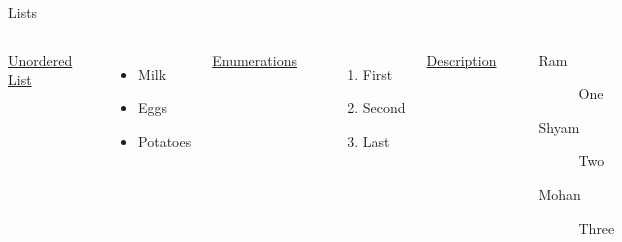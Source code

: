 \documentclass[10pt]{beamer}
\begin{document}
\begin{frame}[fragile]{Lists}  
  \begin{columns}[T,onlytextwidth]
  
		\underline{Unordered List}
        
\begin{verbatim}
\begin{itemize}
  \item Milk 
  \item Eggs 
  \item Potatoes
\end{itemize}\end{verbatim}
      
      \begin{itemize}
      \item Milk \item Eggs \item Potatoes
      \end{itemize}
      
    \underline{Enumerations}
    
\begin{verbatim}
\begin{enumerate}
  \item First 
  \item Second
  \item Last
\end{enumerate}\end{verbatim}

    \begin{enumerate}
    \item First \item Second \item Last
    \end{enumerate}

    \underline{Description}
    \begin{verbatim}
\begin{description}
  \item[Ram] One 
  \item[Shyam] Two
  \item[Mohan] Three
\end{description}\end{verbatim}

    \begin{description}
      \item[Ram] One 
      \item[Shyam] Two
      \item[Mohan] Three
    \end{description}
\end{columns}
\end{frame}
\end{document}
